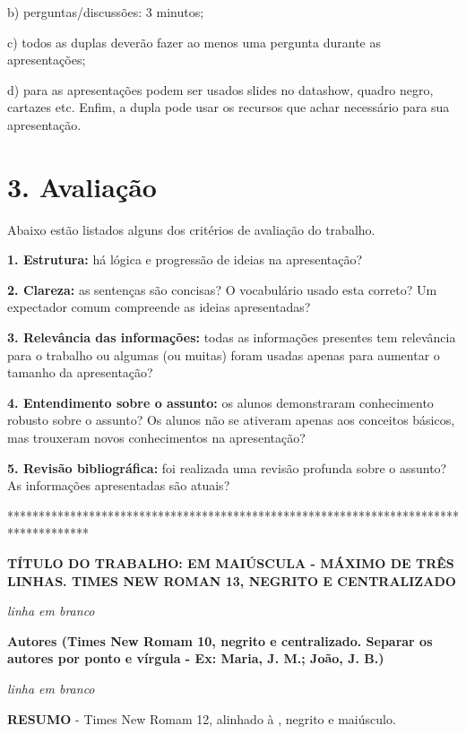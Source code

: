 \documentclass[a4paper,10pt]{article}
\begin{document}
    b) perguntas/discussões: 3 minutos;

    c) todos as duplas deverão fazer ao menos uma pergunta durante as apresentações;

    d) para as apresentações podem ser usados slides no datashow, quadro negro, cartazes etc. Enfim, a dupla pode usar os recursos que achar necessário para sua apresentação.


   \section* {3. Avaliação}
   \noindent

    Abaixo estão listados alguns dos critérios de avaliação do trabalho.

    \textbf{1. Estrutura:} há lógica e progressão de ideias na apresentação?

    \textbf{2. Clareza:} as sentenças são concisas? O vocabulário usado esta correto? Um expectador comum compreende as ideias apresentadas?

     \textbf{3. Relevância das informações:} todas as informações presentes tem relevância para o trabalho ou algumas (ou muitas) foram usadas apenas para aumentar o tamanho da apresentação?

    \textbf{4. Entendimento sobre o assunto:} os alunos demonstraram conhecimento robusto sobre o assunto? Os alunos não se ativeram apenas aos conceitos básicos, mas trouxeram  novos conhecimentos na apresentação?

    \textbf {5. Revisão bibliográfica:} foi realizada uma revisão profunda sobre o assunto? As informações apresentadas são atuais?


\vspace{10ex}

*************************************************************************************

  {\centering
  \textbf{TÍTULO DO TRABALHO: EM MAIÚSCULA - MÁXIMO DE TRÊS LINHAS. TIMES NEW ROMAN 13, NEGRITO E  CENTRALIZADO}

  \textit{linha em branco}

  \textbf{Autores (Times New Romam 10, negrito e centralizado. Separar os autores por ponto e vírgula - Ex: Maria, J. M.; João, J. B.)}

  \textit{linha em branco}

  \par
  }

  \noindent
  \textbf{RESUMO} - Times New Romam 12, alinhado à , negrito e maiúsculo.
\end{document}
